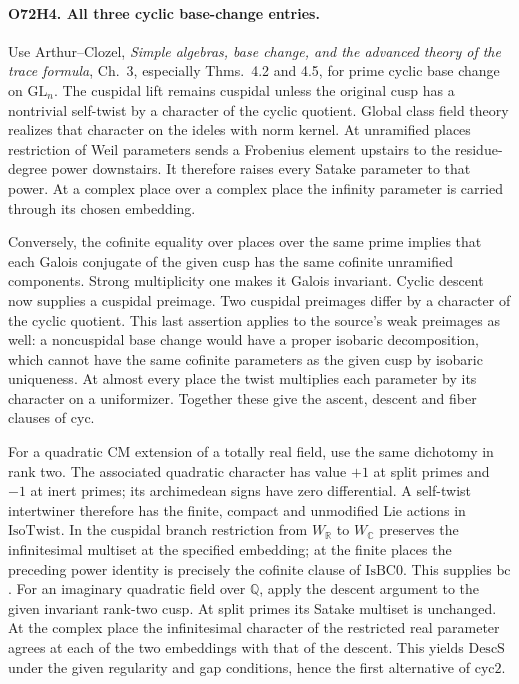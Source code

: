 \paragraph{O72H4. All three cyclic base-change entries.}
Use Arthur--Clozel, \emph{Simple algebras, base change, and the advanced
theory of the trace formula}, Ch.~3, especially Thms.~4.2 and 4.5,
for prime cyclic base change on $\mathrm{GL}_n$. The cuspidal
lift remains cuspidal unless the original cusp has a nontrivial
self-twist by a character of the cyclic quotient. Global class
field theory realizes that character on the ideles with norm
kernel. At unramified places restriction of Weil parameters sends a
Frobenius element upstairs to the residue-degree power downstairs.
It therefore raises every Satake parameter to that power. At a
complex place over a complex place the infinity parameter is carried
through its chosen embedding.

Conversely, the cofinite equality over places over the same prime
implies that each Galois conjugate of the given cusp has the same
cofinite unramified components. Strong multiplicity one makes it
Galois invariant. Cyclic descent now supplies a cuspidal preimage.
Two cuspidal preimages differ by a character of the cyclic quotient.
This last assertion applies to the source's weak preimages as
well: a noncuspidal base change would have a proper isobaric
decomposition, which cannot have the same cofinite parameters as the
given cusp by isobaric uniqueness. At almost every place the twist
multiplies each parameter by its character on a uniformizer.
Together these give the ascent, descent and fiber clauses of
$\mathrm{cyc}$.

For a quadratic CM extension of a totally real field, use the same
dichotomy in rank two. The associated quadratic character has value
$+1$ at split primes and $-1$ at inert primes; its archimedean signs
have zero differential. A self-twist intertwiner therefore has the
finite, compact and unmodified Lie actions in $\mathrm{IsoTwist}$.
In the cuspidal branch restriction from $W_{\mathbb R}$ to
$W_{\mathbb C}$ preserves the infinitesimal multiset at the
specified embedding; at the finite places the preceding power
identity is precisely the cofinite clause of $\mathrm{IsBC0}$.
This supplies $\mathrm{bc}$. For an imaginary quadratic field over
$\mathbb Q$, apply the descent argument to the given invariant
rank-two cusp. At split primes its Satake multiset is unchanged.
At the complex place the infinitesimal character of the restricted
real parameter agrees at each of the two embeddings with that of
the descent. This yields $\mathrm{DescS}$ under the given regularity
and gap conditions, hence the first alternative of $\mathrm{cyc2}$.

